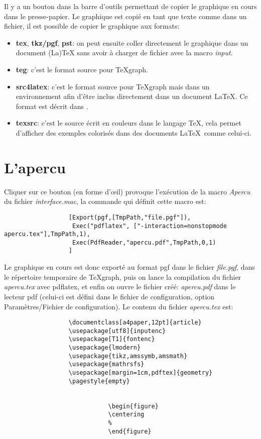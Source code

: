 Il y a un bouton dans la barre d'outils permettant de copier le graphique en cours dans le presse-papier. Le graphique est copié en tant que texte comme dans un fichier, il est possible de copier le graphique aux formats:

 \begin{itemize}
 \item \textbf{tex}, \textbf{tkz/pgf}, \textbf{pst}: on peut ensuite coller directement le graphique dans un document (La)TeX sans avoir à charger de fichier avec la macro \textit{input}.
 \item \textbf{teg}: c'est le format source pour TeXgraph.
 \item \textbf{src4latex}: c'est le format source pour TeXgraph mais dans un environnement afin d'être inclus directement dans un document \LaTeX.  Ce format est décrit dans .
 \item \textbf{texsrc}: c'est le source écrit en couleurs dans le langage \TeX, cela permet d'afficher des exemples colorisés dans des documents \LaTeX\ comme celui-ci.
 \end{itemize}


\section{L'apercu}

Cliquer sur ce bouton (en forme d'œil) provoque l'exécution de la macro \textsl{Apercu} du fichier \textit{interface.mac}, la commande qui définit cette macro est:

\begin{verbatim}
                  [Export(pgf,[TmpPath,"file.pgf"]), 
                   Exec("pdflatex", ["-interaction=nonstopmode apercu.tex"],TmpPath,1),
                   Exec(PdfReader,"apercu.pdf",TmpPath,0,1)
                  ]
\end{verbatim}

Le graphique en cours est donc exporté au format pgf dans le fichier \textit{file.pgf}, dans le répertoire temporaire de TeXgraph, puis on lance la compilation du fichier \textit{apercu.tex} avec pdflatex, et enfin  on ouvre le fichier créé: \textit{apercu.pdf} dans le lecteur pdf (celui-ci est défini dans le fichier de configuration, option Paramètres/Fichier de configuration). Le contenu du fichier \textit{apercu.tex} est:

\begin{verbatim}
                  \documentclass[a4paper,12pt]{article}
                  \usepackage[utf8]{inputenc}
                  \usepackage[T1]{fontenc}
                  \usepackage{lmodern}
                  \usepackage{tikz,amssymb,amsmath}
                  \usepackage{mathrsfs}
                  \usepackage[margin=1cm,pdftex]{geometry}
                  \pagestyle{empty}

                  
                             \begin{figure}
                             \centering
                             %
                             \end{figure}
                  
\end{verbatim}

